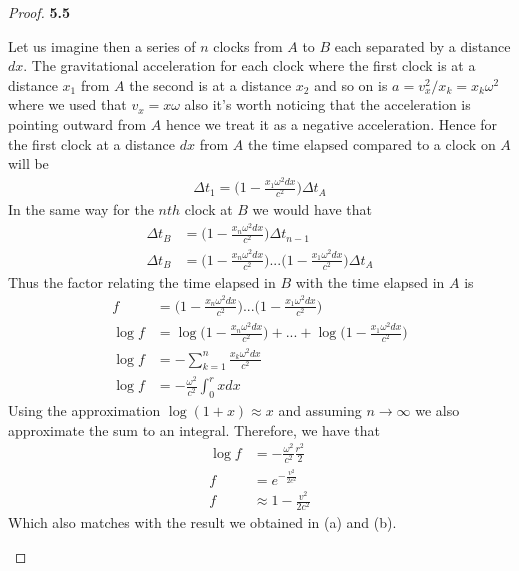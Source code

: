 \documentclass[11pt]{article}
\theoremstyle{definition}
\begin{document}
\begin{proof}{\textbf{5.5}}
\begin{itemize}
    Let us imagine then a series of $n$ clocks from $A$ to $B$ each
    separated by a distance $dx$.
    The gravitational acceleration for each clock where the first clock
    is at a distance $x_1$ from $A$ the second is at a distance $x_2$ and so on
    is $a = v_x^2/x_k = x_k\omega^2$ where we used that $v_x = x\omega$ also
    it's worth noticing that the acceleration is pointing outward from $A$
    hence we treat it as a negative acceleration.
    Hence for the first clock at a distance $dx$ from $A$ the time elapsed
    compared to a clock on $A$ will be
    \begin{align*}
        \Delta t_1 = \bigg(1 - \frac{x_1\omega^2dx}{c^2}\bigg)\Delta t_A
    \end{align*}
    In the same way for the $nth$ clock at $B$ we would have that
    \begin{align*}
        \Delta t_B &= \bigg(1 - \frac{x_n\omega^2dx}{c^2}\bigg)\Delta t_{n-1}\\
        \Delta t_B &=
        \bigg(1 - \frac{x_n\omega^2dx}{c^2}\bigg)...
        \bigg(1 - \frac{x_1\omega^2dx}{c^2}\bigg)
        \Delta t_{A}
    \end{align*}
    Thus the factor relating the time elapsed in $B$ with the time elapsed in
    $A$ is 
    \begin{align*}
        f &= \bigg(1 - \frac{x_n\omega^2dx}{c^2}\bigg)...
        \bigg(1 - \frac{x_1\omega^2dx}{c^2}\bigg)\\
        \log f &= \log \bigg(1 - \frac{x_n\omega^2dx}{c^2}\bigg) + ...+
        \log \bigg(1 - \frac{x_1\omega^2dx}{c^2}\bigg)\\
        \log f &= -\sum_{k = 1}^n \frac{x_k\omega^2dx}{c^2}\\
        \log f &= -\frac{\omega^2}{c^2} \int_0^r xdx
    \end{align*}
    Using the approximation $\log(1 + x) \approx x$ and assuming $n \to \infty$ 
    we also approximate the sum to an integral. Therefore, we have that
    \begin{align*}
        \log f &= -\frac{\omega^2}{c^2} \frac{r^2}{2}\\
        f &= e^{-\frac{v^2}{2c^2}}\\
        f &\approx 1 - \frac{v^2}{2c^2}
    \end{align*}
    Which also matches with the result we obtained in (a) and (b).
\end{itemize}
\end{proof}
\cleardoublepage
\end{document}
